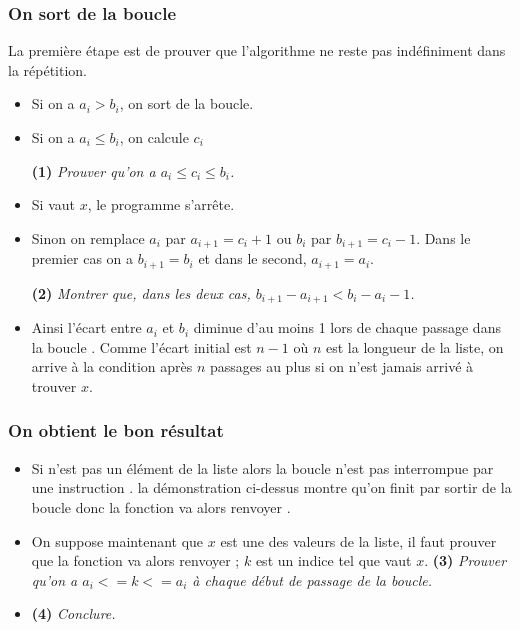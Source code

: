 \subsubsection{On sort de la boucle }
La première étape est de prouver que l'algorithme ne reste pas indéfiniment dans la répétition.

\begin{itemize}
    \item Si on a $a_i > b_i$, on sort de la boucle.
    \item Si on a $a_i \le b_i$, on calcule $c_i$

{\bf (1)} {\it Prouver qu'on a  $a_i \le c_i \le b_i$.}
\item Si  vaut $x$, le programme s'arrête.
\item Sinon on remplace $a_i$ par $a_{i+1} = c_i+1$  ou $b_i$ par $b_{i+1} = c_i-1$.
Dans le premier cas on a $b_{i+1} = b_i$ et dans le second, $a_{i+1}=a_i$.

{\bf (2)} {\it Montrer que, dans les deux cas, $b_{i+1} - a_{i+1} < b_i - a_i - 1$.}
\item Ainsi l'écart entre $a_i$ et $b_i$ diminue d'au moins 1 lors de chaque passage dans la boucle . Comme l'écart initial est $n-1$ où $n$ est la longueur de la liste, on arrive à la condition  après $n$ passages au plus si on n'est jamais arrivé à trouver $x$.
\end{itemize}
\subsubsection{On obtient le bon résultat}
\begin{itemize}
    \item Si  n'est pas un élément de la liste alors la boucle  n'est pas interrompue par une instruction . la démonstration ci-dessus montre qu'on finit par sortir de la boucle  donc la fonction va alors renvoyer .
    \item On suppose maintenant que $x$ est une des valeurs de la liste, il faut prouver que la fonction va alors renvoyer  ;  $k$ est un indice tel que  vaut $x$.
{\bf (3)} {\it Prouver qu'on a  $a_i <= k <= a_i$ à chaque début de passage de la boucle.}    
    \item {\bf (4)} {\it Conclure.}  
\end{itemize}
